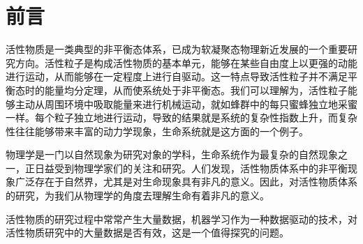 \section{前言}
活性物质是一类典型的非平衡态体系，已成为软凝聚态物理新近发展的一个重要研究方向。活性粒子是构成活性物质的基本单元，能够在某些自由度上以更强的动能进行运动，从而能够在一定程度上进行自驱动。这一特点导致活性粒子并不满足平衡态时的能量均分定理，从而使系统处于非平衡态\cite{shi2012}。我们可以理解为，活性粒子能够主动从周围环境中吸取能量来进行机械运动\cite{MLAM}，就如蜂群中的每只蜜蜂独立地采蜜一样。每个粒子独立地进行运动，导致的结果就是系统的复杂性指数上升，而复杂性往往能够带来丰富的动力学现象，生命系统就是这方面的一个例子。

物理学是一门以自然现象为研究对象的学科，生命系统作为最复杂的自然现象之一，正日益受到物理学家们的关注和研究。人们发现，活性物质体系中的非平衡现象广泛存在于自然界，尤其是对生命现象具有非凡的意义。因此，对活性物质体系的研究，为我们从物理学的角度去理解生命有着非凡的意义\cite{shi2012}。

活性物质的研究过程中常常产生大量数据，机器学习作为一种数据驱动的技术，对活性物质研究中的大量数据是否有效，这是一个值得探究的问题。